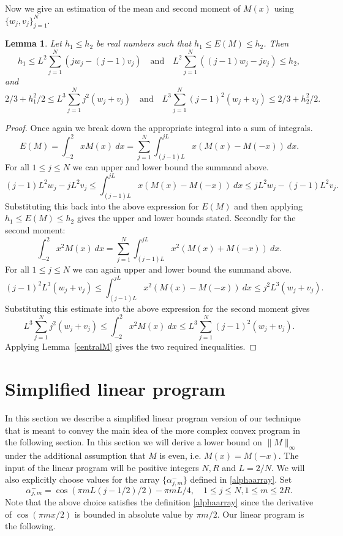 \documentclass[12pt]{article}
\newtheorem{lemma}[theorem]{Lemma}
\numberwithin{equation}{section}
\begin{document}
Now we give an estimation of the mean and second moment of $M(x)$ using $\{w_j,v_j\}_{j=1}^N$.

\begin{lemma}\label{momboundslem} Let $h_1\leq h_2$ be real numbers such that $h_1 \leq E(M) \leq h_2$. Then
  \[ h_1\leq L^2 \sum_{j=1}^{N}  (jw_j-(j-1)v_j) \quad \text{and} \quad  L^2 \sum_{j=1}^{N}  ((j-1)w_j-jv_j) \leq h_2 ,\]
  and 
\[    2/3+h_1^2/2 \leq L^3 \sum_{j=1}^{N}  j^2 (w_j +v_j) \quad \text{and} \quad L^3 \sum_{j=1}^{N}  (j-1)^2 (w_j +v_j)\leq 2/3+h_2^2/2.\]

\end{lemma} 

\begin{proof} Once again we break down the appropriate integral into a sum of integrals. 
\[  E(M) = \int_{-2}^2 x M(x) \ dx = \sum_{j=1}^N  \int_{(j-1)L}^{jL} x(M(x)-M(-x)) \ dx .\]
For all $1 \leq j \leq N$ we can upper and lower bound the summand above.
\[ (j-1)L^2w_j -jL^2v_j \leq   \int_{(j-1)L}^{jL} x(M(x)-M(-x)) \ dx \leq jL^2w_j -(j-1)L^2v_j.\]
Substituting this back into the above expression for $E(M)$ and then applying $h_1 \leq E(M) \leq h_2$ gives the upper and lower bounds stated. Secondly for the second moment: 
\[ \int_{-2}^2 x^2  M(x) \ dx = \sum_{j=1}^N  \int_{(j-1)L}^{jL} x^2(M(x)+M(-x)) \ dx .\]
For all $1 \leq j \leq N$ we can again upper and lower bound the summand above.
\[ (j-1)^2L^3(w_j+v_j) \leq   \int_{(j-1)L}^{jL} x^2(M(x)-M(-x)) \ dx \leq j^2L^3(w_j+v_j).\]
Substituting this estimate into the above expression for the second moment gives 
\[ L^3 \sum_{j=1}^{N}  j^2 (w_j +v_j)\leq \int_{-2}^2 x^2  M(x) \ dx  \leq L^3 \sum_{j=1}^{N}  (j-1)^2 (w_j +v_j).\]
Applying Lemma~\ref{centralM} gives the two required inequalities.

\end{proof}









\section{Simplified linear program}\label{simpsec}

In this section we describe a simplified linear program version of our technique that is meant to convey the main idea of the more complex convex program in the following section. In this section we will derive a lower bound on $\| M \|_{\infty}$ under the additional assumption that $M$ is even, i.e. $M(x) = M(-x)$. The input of the linear program will be positive integers $N,R$ and $L = 2/N$. We will also explicitly choose values for the array $\{\alpha_{j,m}^-\}$ defined in \eqref{alphaarray}. Set 
\[\alpha_{j,m}^- = \cos(\pi mL(j-1/2)/2) - \pi m L/4,  \quad 1 \leq j \leq N, 1 \leq m \leq 2R.\]
Note that the above choice satisfies the definition \eqref{alphaarray} since the derivative of $\cos(\pi m x/2)$ is bounded in absolute value by $\pi m/2$. Our linear program is the following.
\end{document}
